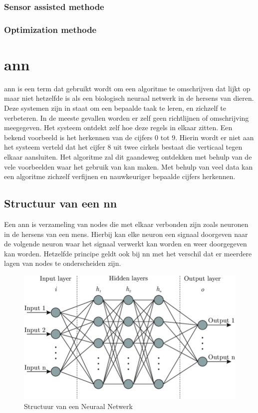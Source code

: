 		\subsubsection{Sensor assisted methode}
		\subsubsection{Optimization methode}
		
\newpage

\section{\gls{ann}}
\gls{ann} is een term dat gebruikt wordt om een algoritme te omschrijven dat lijkt op maar niet hetzelfde is als een biologisch neuraal netwerk in de hersens van dieren. Deze systemen zijn in staat om een bepaalde taak te leren, en zichzelf te verbeteren. In de meeste gevallen worden er zelf geen richtlijnen of omschrijving meegegeven. Het systeem ontdekt zelf hoe deze regels in elkaar zitten. Een bekend voorbeeld is het herkennen van de cijfers 0 tot 9. Hierin wordt er niet aan het systeem verteld dat het cijfer 8 uit twee cirkels bestaat die verticaal tegen elkaar aansluiten. Het algoritme zal dit gaandeweg ontdekken met behulp van de vele voorbeelden waar het gebruik van kan maken. Met behulp van veel data kan een algoritme zichzelf verfijnen en nauwkeuriger bepaalde cijfers herkennen.

	\subsection{Structuur van een \gls{nn}}
	Een \gls{ann} is verzameling van nodes die met elkaar verbonden zijn zoals neuronen in de hersens van een mens. Hierbij kan elke neuron een signaal doorgeven naar de volgende neuron waar het signaal verwerkt kan worden en weer doorgegeven kan worden. Hetzelfde principe geldt ook bij \gls{nn} met het verschil dat er meerdere lagen van nodes te onderscheiden zijn. 
	
	\begin{figure}
	    \centering
		\includegraphics[width=140mm]{afbeeldingen/neuralNetwork2.PNG}
		\caption{Structuur van een Neuraal Netwerk}
		\label{fig:neuralNetworkStructuur}
	\end{figure}


